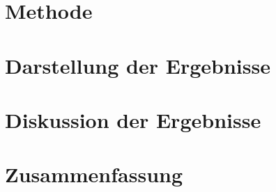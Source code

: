 \section{Methode} %



\newpage


\section{Darstellung der Ergebnisse} %



\newpage


\section{Diskussion der Ergebnisse} %



\newpage


\section{Zusammenfassung} %



\newpage


\begin{thebibliography}{9} %








 
\end{thebibliography}

